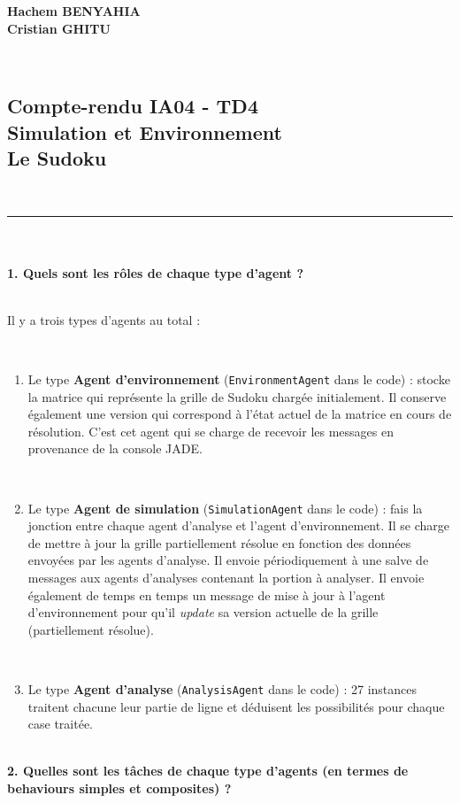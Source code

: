 \documentclass[11pt]{report}
\begin{document}
\selectfont

\noindent
\textbf{Hachem BENYAHIA}
~\\
\textbf{Cristian GHITU}

~\\
\begin{center}
\section*{Compte-rendu IA04 - TD4 ~\\ Simulation et Environnement ~\\ Le Sudoku}

~\\
\rule{\textwidth}{1pt}
\end{center}

~\\\\
\textbf{1. Quels sont les rôles de chaque type d'agent ?}

~\\
Il y a trois types d'agents au total : 

~\
\begin{enumerate}
\item Le type \textbf{Agent d'environnement} (\verb|EnvironmentAgent| dans le code) : stocke la matrice qui représente la grille de Sudoku chargée initialement. Il conserve également une version qui correspond à l'état actuel de la matrice en cours de résolution. C'est cet agent qui se charge de recevoir les messages en provenance de la console JADE.

~\
\item Le type \textbf{Agent de simulation} (\verb|SimulationAgent| dans le code) : fais la jonction entre chaque agent d'analyse et l'agent d'environnement. Il se charge de mettre à jour la grille partiellement résolue en fonction des données envoyées par les agents d'analyse. Il envoie périodiquement à une salve de messages aux agents d'analyses contenant la portion à analyser. Il envoie également de temps en temps un message de mise à jour à l'agent d'environnement pour qu'il \textit{update} sa version actuelle de la grille (partiellement résolue).

~\
\item Le type \textbf{Agent d'analyse} (\verb|AnalysisAgent| dans le code) : 27 instances traitent chacune leur partie de ligne et déduisent les possibilités pour chaque case traitée.
\end{enumerate}

~\\
\textbf{2. Quelles sont les tâches de chaque type d'agents (en termes de behaviours simples et
composites) ?}
\end{document}
